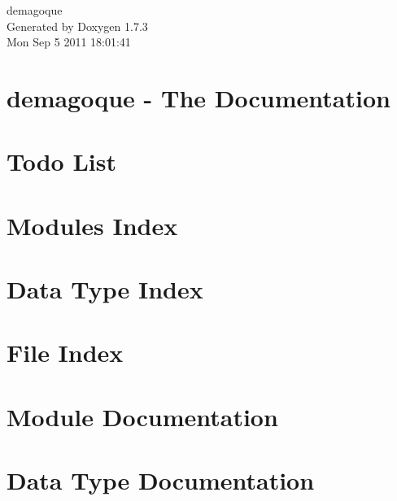\documentclass[a4paper]{book}
\begin{document}
\hypersetup{pageanchor=false}
\begin{titlepage}
\vspace*{7cm}
\begin{center}
{\Large demagoque }\\
\vspace*{1cm}
{\large Generated by Doxygen 1.7.3}\\
\vspace*{0.5cm}
{\small Mon Sep 5 2011 18:01:41}\\
\end{center}
\end{titlepage}
\clearemptydoublepage
{}
\tableofcontents
\clearemptydoublepage
{}
\hypersetup{pageanchor=true}
\chapter{demagoque -\/ The Documentation}
\label{index}\hypertarget{index}{}
\chapter{Todo List}
\label{todo}
\hypertarget{todo}{}

\chapter{Modules Index}

\chapter{Data Type Index}

\chapter{File Index}

\chapter{Module Documentation}
















\chapter{Data Type Documentation}


\end{document}
